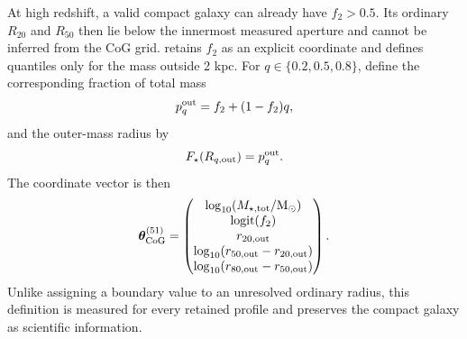 At high redshift, a valid compact galaxy can already have $f_2>0.5$. Its
ordinary $R_{20}$ and $R_{50}$ then lie below the innermost measured aperture
and cannot be inferred from the CoG grid. \ExpFiftyOne{} retains $f_2$ as an
explicit coordinate and defines quantiles only for the mass outside 2 kpc. For
$q\in\{0.2,0.5,0.8\}$, define the corresponding fraction of total mass
\begin{equation}
  p_q^{\rm out}=f_2+(1-f_2)q,
  \label{eq:outer_level}
\end{equation}
and the outer-mass radius by
\begin{equation}
  F_\star(R_{q,\rm out})=p_q^{\rm out}.
  \label{eq:outer_quantiles}
\end{equation}
The coordinate vector is then
\begin{equation}
  \bm{\theta}_{\mathrm{CoG}}^{(51)}=
  \begin{pmatrix}
    \log_{10}(M_{\star,\rm tot}/\mathrm{M}_{\odot})\\
    \operatorname{logit}(f_2)\\
    r_{20,\rm out}\\
    \log_{10}(r_{50,\rm out}-r_{20,\rm out})\\
    \log_{10}(r_{80,\rm out}-r_{50,\rm out})
  \end{pmatrix}.
  \label{eq:exp51_coordinates}
\end{equation}
Unlike assigning a boundary value to an unresolved ordinary radius, this
definition is measured for every retained profile and preserves the compact
galaxy as scientific information.

